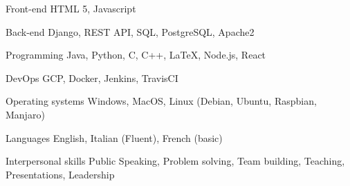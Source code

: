 

\begin{cvskills}

  \cvskill
    {Front-end} %
    {HTML 5, Javascript} %

  \cvskill
    {Back-end} %
    {Django, REST API, SQL, PostgreSQL, Apache2} %

  \cvskill
    {Programming} %
    {Java, Python, C, C++, LaTeX, Node.js, React} %

    \cvskill
    {DevOps}
    {GCP, Docker, Jenkins, TravisCI}
    
    \cvskill
    {Operating systems}
    {Windows, MacOS, Linux (Debian, Ubuntu, Raspbian, Manjaro)}
    
  \cvskill
    {Languages} %
    {English, Italian (Fluent), French (basic)} %

    \cvskill
    {Interpersonal skills}
    {Public Speaking, Problem solving, Team building, Teaching, Presentations, Leadership}
    
\end{cvskills}
